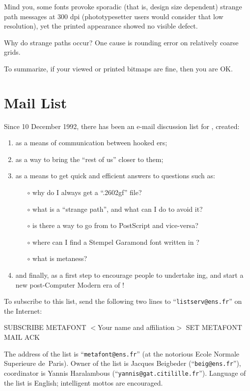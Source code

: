 Mind you, some fonts provoke sporadic
(that is, design size dependent)
strange path messages at 300 dpi
(phototypesetter users would consider that low resolution),
yet the printed appearance showed no visible defect.

Why do strange paths occur?
One cause is rounding error on relatively coarse grids.

To summarize, if your viewed or printed bitmaps are fine,
then you are OK.


\section{\MF{} Mail List}

Since 10 December 1992, there has been an e-mail discussion list
for \MF{}, created:

\begin{enumerate}
\item  as a means of communication between hooked \MF{}ers;

\item  as a way to bring the ``rest of us'' closer to them;

\item  as a means to get quick and efficient answers to questions
       such as:

\begin{itemize}
    \item[$\circ$]  why do I always get a ``.2602gf'' file?
    \item[$\circ$]  what is a ``strange path'',
                  and what can I do to avoid it?
    \item[$\circ$]  is there a way to go from \MF{} to PostScript
                  and vice-versa?
    \item[$\circ$]  where can I find a Stempel Garamond font
                  written in \MF{}?
    \item[$\circ$]  what is metaness?
\end{itemize}

\item  and finally, as a first step to encourage people to undertake
    \MF{}ing, and start a new post-Computer Modern era of \MF{}!
\end{enumerate}

To subscribe to this list, send the following two lines to
``{\tt listserv@ens.fr}'' on the Internet:
{\obeylines

        SUBSCRIBE METAFONT $<$Your name and affiliation$>$
        SET METAFONT MAIL ACK

}
The address of the list is ``{\tt metafont@ens.fr}''
(at the notorious Ecole Normale Superieure de~Paris).
Owner of the list is Jacques {\sc Beigbeder}
(``{\tt beig@ens.fr}''),
coordinator is Yannis {\sc Haralambous}
(``{\tt yannis@gat.citilille.fr}'').
Language of the list is English;
intelligent mottos are encouraged.


